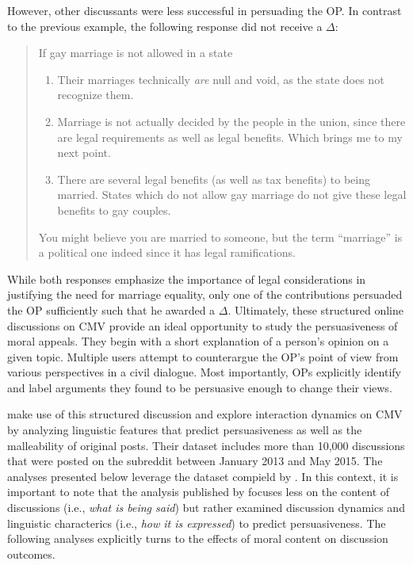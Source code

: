 However, other discussants were less successful in persuading the OP. In contrast to the previous example, the following response did not receive a $\Delta$:
\begin{quote}\singlespacing
If gay marriage is not allowed in a state
\begin{enumerate}
\item Their marriages technically \textit{are} null and void, as the state does not recognize them.
\item Marriage is not actually decided by the people in the union, since there are legal requirements as well as legal benefits. Which brings me to my next point.
\item There are several legal benefits (as well as tax benefits) to being married. States which do not allow gay marriage do not give these legal benefits to gay couples.      
\end{enumerate}
You might believe you are married to someone, but the term ``marriage'' is a political one indeed since it has legal ramifications.
\end{quote}
While both responses emphasize the importance of legal considerations in justifying the need for marriage equality, only one of the contributions persuaded the OP sufficiently such that he awarded a $\Delta$. Ultimately, these structured online discussions on CMV provide an ideal opportunity to study the persuasiveness of moral appeals. They begin with a short explanation of a person's opinion on a given topic. Multiple users attempt to counterargue the OP's point of view from various perspectives in a civil dialogue. Most importantly, OPs explicitly identify and label arguments they found to be persuasive enough to change their views.

\citet{tan2016winning} make use of this structured discussion and explore interaction dynamics on CMV by analyzing linguistic features that predict persuasiveness as well as the malleability of original posts. Their dataset includes more than 10,000 discussions that were posted on the subreddit between January 2013 and May 2015. The analyses presented below leverage the dataset compield by \citet{tan2016winning}. In this context, it is important to note that the analysis published by \citet{tan2016winning} focuses less on the content of discussions (i.e., \textit{what is being said}) but rather examined discussion dynamics and linguistic characterics (i.e., \textit{how it is expressed}) to predict persuasiveness. The following analyses explicitly turns to the effects of moral content on discussion outcomes.

